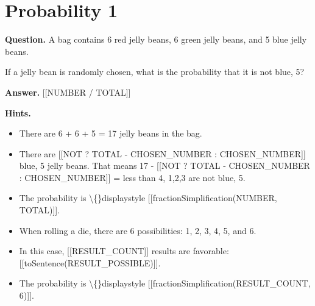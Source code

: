 \documentclass{article}
\begin{document}
\section*{Probability 1}
\textbf{Question.} A bag contains 6 red jelly beans,
                6 green jelly beans, and 5 blue jelly beans.

                If a jelly bean is randomly chosen, what is the probability
                that it is not blue, 5?

\textbf{Answer.} [[NUMBER / TOTAL]]

\textbf{Hints.}
\begin{itemize}
  \item There are 6 + 6 + 5 = 17 jelly beans in the bag.
  \item There are [[NOT ? TOTAL - CHOSEN\_NUMBER : CHOSEN\_NUMBER]] blue, 5 jelly beans.
                That means 17 - [[NOT ? TOTAL - CHOSEN\_NUMBER : CHOSEN\_NUMBER]] = less than 4, 1,2,3 are not blue, 5.
  \item The probability is \textbackslash\{\}displaystyle [[fractionSimplification(NUMBER, TOTAL)]].
  \item When rolling a die, there are 6 possibilities: 1, 2, 3, 4, 5, and 6.
  \item In this case, [[RESULT\_COUNT]] results are favorable: [[toSentence(RESULT\_POSSIBLE)]].
  \item The probability is \textbackslash\{\}displaystyle [[fractionSimplification(RESULT\_COUNT, 6)]].
\end{itemize}
\end{document}

